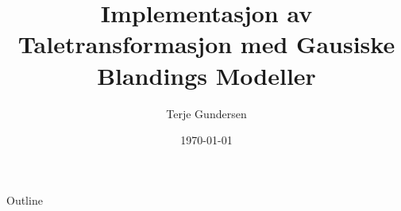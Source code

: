 \documentclass[norsk,mathserif]{beamer}
\title[Taletransformasjon]{Implementasjon av Taletransformasjon med Gausiske Blandings Modeller}
\author{Terje Gundersen}
\institute[Universities of Somewhere and Elsewhere] %
{
  Institutt for Elektronikk og Telekommunikasjon\\
  Norges Teknisk-Naturvitenskapelige Universitet
}
\date{\today}
\theoremstyle{plain}
\theoremstyle{definition}
\begin{document}
	
\begin{frame}
  \titlepage
\end{frame}

\begin{frame}{Outline}
  \tableofcontents
\end{frame}





\end{document}
